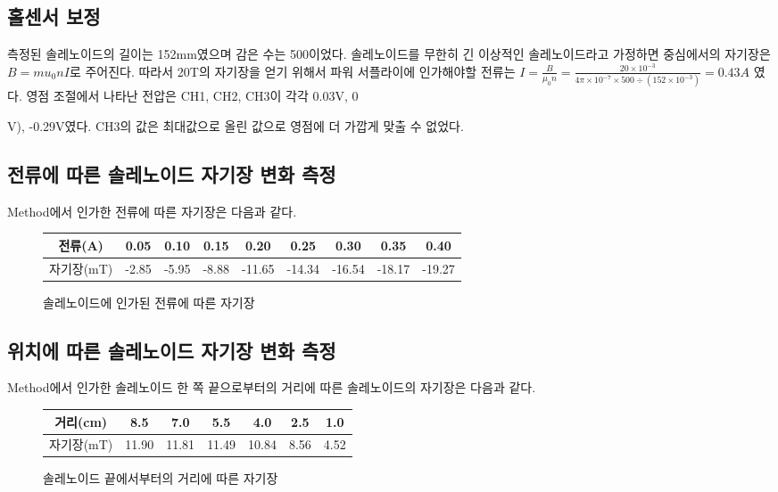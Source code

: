 \documentclass[a4paper]{article}
\begin{document}
	\subsection{홀센서 보정}
		측정된 솔레노이드의 길이는 152\si{mm}였으며 감은 수는 500이었다.
		솔레노이드를 무한히 긴 이상적인 솔레노이드라고 가정하면 중심에서의 자기장은 $B = mu_{0} n I$로 주어진다.
		따라서 20\si{T}의 자기장을 얻기 위해서 파워 서플라이에 인가해야할 전류는 $I = \frac{B}{\mu_{0} n} = \frac{20 \times 10^{-3}}{4\pi \times 10^{-7} \times 500 \div (152 \times 10^{-3})} = 0.43\si{A}$ 였다.
		영점 조절에서 나타난 전압은 CH1, CH2, CH3이 각각 0.03\si{V}, 0{\si{V}), -0.29{\si{V}}였다. 
		CH3의 값은 최대값으로 올린 값으로 영점에 더 가깝게 맞출 수 없었다.

	\subsection{전류에 따른 솔레노이드 자기장 변화 측정}
		Method에서 인가한 전류에 따른 자기장은 다음과 같다.
		\begin{figure}[h]
			\centering
			\begin{tabular}{c|cccccccc}
				\hline \hline
				전류(\si{A}) & 0.05 & 0.10 & 0.15 & 0.20 & 0.25 & 0.30 & 0.35 & 0.40 \\
				\hline
				자기장(\si{mT}) & -2.85 & -5.95 & -8.88 & -11.65 & -14.34 & -16.54 & -18.17 & -19.27 \\
				\hline \hline 
			\end{tabular}
			\caption{솔레노이드에 인가된 전류에 따른 자기장}
			\label{tab:solire}
		\end{figure}

	\subsection{위치에 따른 솔레노이드 자기장 변화 측정}
		Method에서 인가한 솔레노이드 한 쪽 끝으로부터의 거리에 따른 솔레노이드의 자기장은 다음과 같다.
		\begin{figure}[h]
			\centering
			\begin{tabular}{c|cccccc}
				\hline \hline
				거리(\si{cm}) & 8.5 & 7.0 & 5.5 & 4.0 & 2.5 & 1.0 \\
				\hline
				자기장(\si{mT}) & 11.90 & 11.81 & 11.49 & 10.84 & 8.56 & 4.52 \\
				\hline \hline
			\end{tabular}
			\caption{솔레노이드 끝에서부터의 거리에 따른 자기장}
			\label{tab:soldre}
		\end{figure}

}
\end{document}

